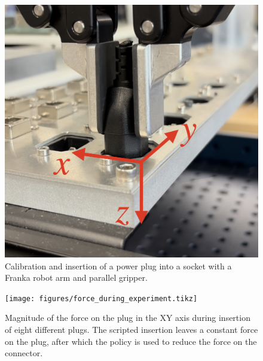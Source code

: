 \begin{figure}
    \centering
    \includegraphics[width=.35\linewidth]{figures/plug_pic_frame_2.png}
    \caption{Calibration and insertion of a power plug into a socket with a Franka robot arm and parallel gripper.}
    \label{fig:plug}
\end{figure}
\begin{figure}
    \centering
    \texttt{[image: figures/force\_during\_experiment.tikz]}
    \caption{Magnitude of the force on the plug in the XY axis during insertion of eight different plugs. The scripted insertion leaves a constant force on the plug, after which the policy is used to reduce the force on the connector.}
  \label{fig:force_during_experiment}
\end{figure}


